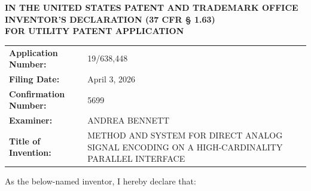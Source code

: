\documentclass[11pt,letterpaper]{article}
\begin{document}
\thispagestyle{empty}

\begin{center}
    \textbf{\large IN THE UNITED STATES PATENT AND TRADEMARK OFFICE} \\
    \vspace{0.3cm}
    \textbf{\large INVENTOR'S DECLARATION (37 CFR \S{} 1.63)} \\
    \textbf{\normalsize FOR UTILITY PATENT APPLICATION}
\end{center}

\vspace{0.4cm}
\noindent\begin{tabular}{p{2.3in}p{4.0in}}
\textbf{Application Number:} & 19/638,448 \\
\textbf{Filing Date:} & April 3, 2026 \\
\textbf{Confirmation Number:} & 5699 \\
\textbf{Examiner:} & ANDREA BENNETT \\
\textbf{Title of Invention:} & METHOD AND SYSTEM FOR DIRECT ANALOG SIGNAL ENCODING ON A HIGH-CARDINALITY PARALLEL INTERFACE \\
\end{tabular}

\vspace{0.6cm}
As the below-named inventor, I hereby declare that:
\end{document}
